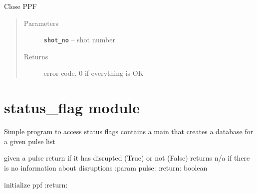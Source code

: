 \documentclass[letterpaper,10pt,english]{sphinxmanual}
\begin{document}

\begin{fulllineitems}
\label{ppf_write:ppf_write.close_ppf}
Close PPF
\begin{quote}\begin{description}
\item[{Parameters}] \leavevmode
\textbf{\texttt{shot\_no}} -- shot number

\item[{Returns}] \leavevmode
error code, 0 if everything is OK

\end{description}\end{quote}

\end{fulllineitems}



\section{status\_flag module}
\label{status_flag:status-flag-module}\label{status_flag::doc}\label{status_flag:module-status_flag}
Simple program to access status flags
contains a main that creates a database for a given pulse list

\begin{fulllineitems}
\label{status_flag:status_flag.find_disruption}
given a pulse return if it has disrupted (True) or not (False)     returns n/a if there is no information about disruptions
:param pulse:
:return: boolean

\end{fulllineitems}


\begin{fulllineitems}
\label{status_flag:status_flag.initread}
initialize ppf
:return:

\end{fulllineitems}

\end{document}
